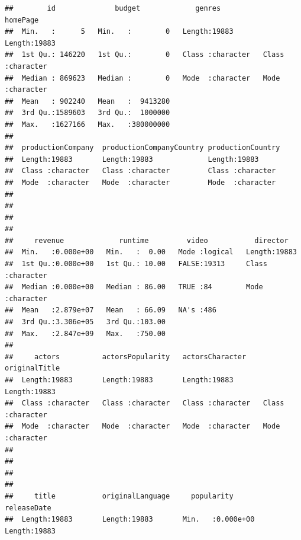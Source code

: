 \documentclass[
]{article}
\begin{document}
\begin{verbatim}
##        id              budget             genres            homePage        
##  Min.   :      5   Min.   :        0   Length:19883       Length:19883      
##  1st Qu.: 146220   1st Qu.:        0   Class :character   Class :character  
##  Median : 869623   Median :        0   Mode  :character   Mode  :character  
##  Mean   : 902240   Mean   :  9413280                                        
##  3rd Qu.:1589603   3rd Qu.:  1000000                                        
##  Max.   :1627166   Max.   :380000000                                        
##                                                                             
##  productionCompany  productionCompanyCountry productionCountry 
##  Length:19883       Length:19883             Length:19883      
##  Class :character   Class :character         Class :character  
##  Mode  :character   Mode  :character         Mode  :character  
##                                                                
##                                                                
##                                                                
##                                                                
##     revenue             runtime         video           director        
##  Min.   :0.000e+00   Min.   :  0.00   Mode :logical   Length:19883      
##  1st Qu.:0.000e+00   1st Qu.: 10.00   FALSE:19313     Class :character  
##  Median :0.000e+00   Median : 86.00   TRUE :84        Mode  :character  
##  Mean   :2.879e+07   Mean   : 66.09   NA's :486                         
##  3rd Qu.:3.306e+05   3rd Qu.:103.00                                     
##  Max.   :2.847e+09   Max.   :750.00                                     
##                                                                         
##     actors          actorsPopularity   actorsCharacter    originalTitle     
##  Length:19883       Length:19883       Length:19883       Length:19883      
##  Class :character   Class :character   Class :character   Class :character  
##  Mode  :character   Mode  :character   Mode  :character   Mode  :character  
##                                                                             
##                                                                             
##                                                                             
##                                                                             
##     title           originalLanguage     popularity        releaseDate       
##  Length:19883       Length:19883       Min.   :0.000e+00   Length:19883      

\end{verbatim}
\end{document}
